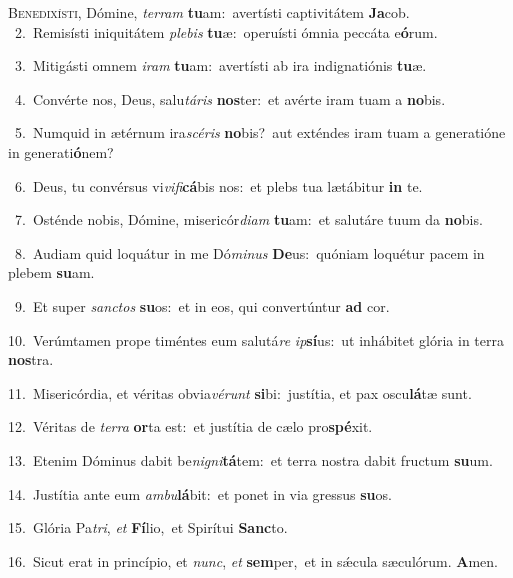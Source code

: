 \lettrine{\initial\textcolor{\initialcolor}{B}}{enedixísti,} Dómine, \textit{ter}\-\textit{ram} \textbf{tu}\-am:~\star avertísti captivitátem \textbf{Ja}\-cob.\\
{\numbfont\textcolor{\numbcolor}{~2.}}~Remisísti iniquitátem \textit{ple}\-\textit{bis} \textbf{tu}\-æ:~\star operuísti ómnia peccáta e\-\textbf{ó}\-rum.\par
{\numbfont\textcolor{\numbcolor}{~3.}}~Mitigásti omnem \textit{i}\-\textit{ram} \textbf{tu}\-am:~\star avertísti ab ira indignatiónis \textbf{tu}\-æ.\par
{\numbfont\textcolor{\numbcolor}{~4.}}~Convérte nos, Deus, salu\-\textit{tá}\-\textit{ris} \textbf{nos}\-ter:~\star et avérte iram tuam a \textbf{no}\-bis.\par
{\numbfont\textcolor{\numbcolor}{~5.}}~Numquid in ætérnum ira\-\textit{scé}\-\textit{ris} \textbf{no}\-bis?~\star aut exténdes iram tuam a generatióne in generati\-\textbf{ó}\-nem?\par
{\numbfont\textcolor{\numbcolor}{~6.}}~Deus, tu convérsus vi\-\textit{vi}\-\textit{fi}\textbf{cá}bis nos:~\star et plebs tua lætábitur \textbf{in} te.\par
{\numbfont\textcolor{\numbcolor}{~7.}}~Osténde nobis, Dómine, misericór\-\textit{di}\-\textit{am} \textbf{tu}\-am:~\star et salutáre tuum da \textbf{no}\-bis.\par
{\numbfont\textcolor{\numbcolor}{~8.}}~Audiam quid loquátur in me Dó\-\textit{mi}\-\textit{nus} \textbf{De}\-us:~\star quóniam loquétur pacem in plebem \textbf{su}\-am.\par
{\numbfont\textcolor{\numbcolor}{~9.}}~Et super \textit{sanc}\-\textit{tos} \textbf{su}\-os:~\star et in eos, qui convertúntur \textbf{ad} cor.\par
{\numbfont\textcolor{\numbcolor}{10.}}~Verúmtamen prope timéntes eum salutá\textit{re} \textit{ip}\-\textbf{sí}us:~\star ut inhábitet glória in terra \textbf{nos}\-tra.\par
{\numbfont\textcolor{\numbcolor}{11.}}~Misericórdia, et véritas obvia\-\textit{vé}\-\textit{runt} \textbf{si}\-bi:~\star justítia, et pax oscu\-\textbf{lá}\-tæ sunt.\par
{\numbfont\textcolor{\numbcolor}{12.}}~Véritas de \textit{ter}\-\textit{ra} \textbf{or}\-ta est:~\star et justítia de cælo pro\-\textbf{spé}\-xit.\par
{\numbfont\textcolor{\numbcolor}{13.}}~Etenim Dóminus dabit be\-\textit{ni}\-\textit{gni}\textbf{tá}tem:~\star et terra nostra dabit fructum \textbf{su}\-um.\par
{\numbfont\textcolor{\numbcolor}{14.}}~Justítia ante eum \textit{am}\-\textit{bu}\textbf{lá}bit:~\star et ponet in via gressus \textbf{su}\-os.\par
{\numbfont\textcolor{\numbcolor}{15.}}~Glória Pa\-\textit{tri}\-, \textit{et} \textbf{Fí}\-lio,~\star et Spirítui \textbf{Sanc}\-to.\par
{\numbfont\textcolor{\numbcolor}{16.}}~Sicut erat in princípio, et \textit{nunc}\-, \textit{et} \textbf{sem}\-per,~\star et in sǽcula sæculórum. \textbf{A}\-men.\par
